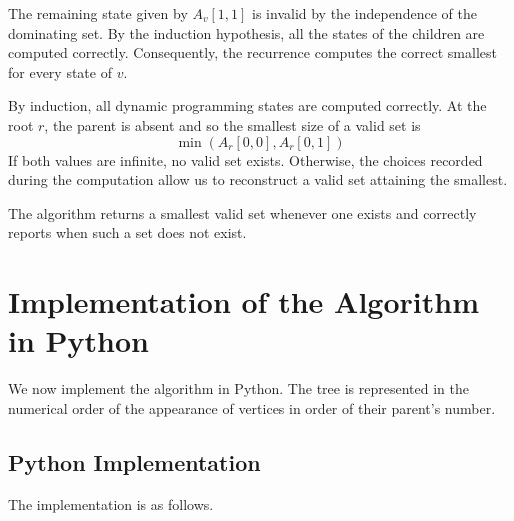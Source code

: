 \documentclass[ a4paper, 11pt]{report}
\theoremstyle{plain}
\theoremstyle{definition}
\begin{document}
The remaining state given by $A_v[1,1]$ is invalid by the independence of the dominating set. By the induction hypothesis, all the states of the children are computed correctly. Consequently, the recurrence computes the correct smallest for every state of $v$.
\newline

By induction, all dynamic programming states are computed correctly. At the root $r$, the parent is absent and so the smallest size of a valid set is
$$
\min\left (A_r[0,0],A_r[0,1]\right )
$$
If both values are infinite, no valid set exists. Otherwise, the choices recorded during the computation allow us to reconstruct a valid set attaining the smallest.
\newline

The algorithm returns a smallest valid set whenever one exists and correctly reports when such a set does not exist.

\section{Implementation of the Algorithm in Python}

We now implement the algorithm in Python. The tree is represented in the numerical order of the appearance of vertices in order of their parent's number. 

\subsection{Python Implementation}

The implementation is as follows. 
\end{document}
